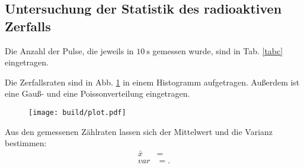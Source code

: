 \subsection{Untersuchung der Statistik des radioaktiven Zerfalls}

Die Anzahl der Pulse, die jeweils in $\SI{10}{\second}$ gemessen wurde, sind in Tab. \ref{tabc} eingetragen.



Die Zerfallsraten sind in Abb. \ref{fig:histogramm} in einem Histogramm aufgetragen. Außerdem ist eine Gauß- und eine Poissonverteilung eingetragen.
\begin{figure}
    \centering
    \texttt{[image: build/plot.pdf]}
    \caption{}
    \label{fig:histogramm}
\end{figure}

\noindent Aus den gemessenen Zählraten lassen sich der  Mittelwert und die Varianz bestimmen: %
\begin{align*}
    \bar{x} &= \num{} \\
    var &= \num{}.
\end{align*}